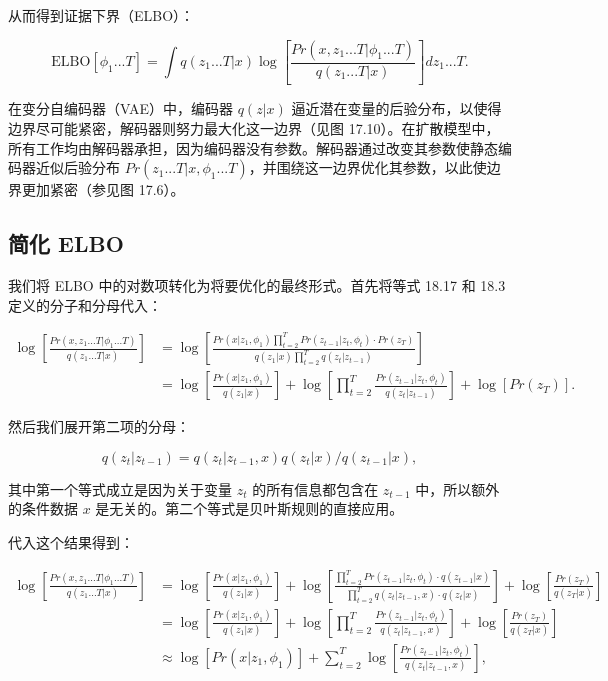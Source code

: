 从而得到证据下界（ELBO）：

\begin{equation}
\text{ELBO}[\phi_1...T] = \int q(z_1...T|x) \log \left[ \frac{Pr(x, z_1...T|\phi_1...T)}{q(z_1...T|x)} \right] dz_1...T. 
\end{equation}

在变分自编码器（VAE）中，编码器 \(q(z|x)\) 逼近潜在变量的后验分布，以使得边界尽可能紧密，解码器则努力最大化这一边界（见图 17.10）。在扩散模型中，所有工作均由解码器承担，因为编码器没有参数。解码器通过改变其参数使静态编码器近似后验分布 \(Pr(z_1...T|x, \phi_1...T)\)，并围绕这一边界优化其参数，以此使边界更加紧密（参见图 17.6）。


\subsection{简化 ELBO}
我们将 ELBO 中的对数项转化为将要优化的最终形式。首先将等式 18.17 和 18.3 定义的分子和分母代入：


\begin{align}
\log \left[ \frac{Pr(x, z_1...T|\phi_1...T)}{q(z_1...T|x)} \right] &= \log \left[ \frac{Pr(x|z_1, \phi_1) \prod_{t=2}^{T} Pr(z_{t-1}|z_t, \phi_t) \cdot Pr(z_T)}{q(z_1|x) \prod_{t=2}^{T} q(z_t|z_{t-1})} \right] \\
&= \log \left[ \frac{Pr(x|z_1, \phi_1)}{q(z_1|x)} \right] + \log \left[ \prod_{t=2}^{T} \frac{Pr(z_{t-1}|z_t, \phi_t)}{q(z_t|z_{t-1})} \right] + \log [ Pr(z_T) ]. 
\end{align} 


然后我们展开第二项的分母：

\begin{equation}
q(z_t|z_{t-1}) = q(z_t|z_{t-1}, x)q(z_t|x) / q(z_{t-1}|x), 
\end{equation}

其中第一个等式成立是因为关于变量 \(z_t\) 的所有信息都包含在 \(z_{t-1}\) 中，所以额外的条件数据 \(x\) 是无关的。第二个等式是贝叶斯规则的直接应用。

代入这个结果得到：

\begin{align}
\log \left[ \frac{Pr(x, z_1...T|\phi_1...T)}{q(z_1...T|x)} \right] &= \log \left[ \frac{Pr(x|z_1, \phi_1)}{q(z_1|x)} \right] + \log \left[ \frac{\prod_{t=2}^{T} Pr(z_{t-1}|z_t, \phi_t) \cdot q(z_{t-1}|x)}{\prod_{t=2}^{T} q(z_t|z_{t-1}, x) \cdot q(z_t|x)} \right] + \log \left[ \frac{Pr(z_T)}{q(z_T|x)} \right] \\
&= \log \left[ \frac{Pr(x|z_1, \phi_1)}{q(z_1|x)} \right] + \log \left[ \prod_{t=2}^{T} \frac{Pr(z_{t-1}|z_t, \phi_t)}{q(z_t|z_{t-1}, x)} \right] + \log \left[ \frac{Pr(z_T)}{q(z_T|x)} \right] \\
&\approx \log \left[ Pr(x|z_1, \phi_1) \right] + \sum_{t=2}^{T} \log \left[ \frac{Pr(z_{t-1}|z_t, \phi_t)}{q(z_t|z_{t-1}, x)} \right], 
\end{align} 


